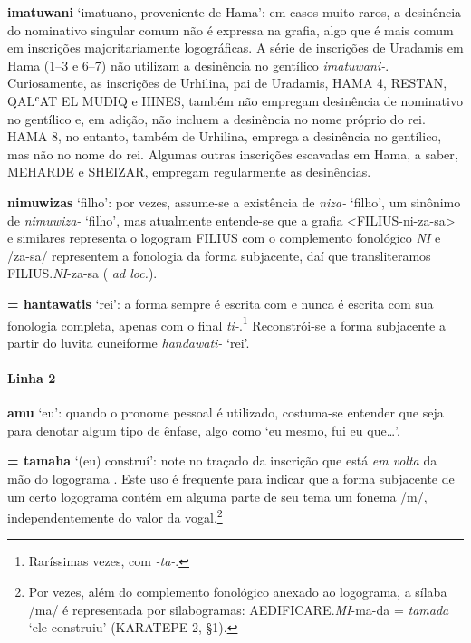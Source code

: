 \noindent\textbf{imatuwani} `imatuano, proveniente de Hama': em casos muito raros, a
desinência do nominativo singular comum não é expressa na grafia, algo que é
mais comum em inscrições majoritariamente logográficas. A série de inscrições de
Uradamis em Hama (1--3 e 6--7) não utilizam a desinência no gentílico
\emph{imatuwani-}.
Curiosamente, as inscrições de Urhilina, pai de Uradamis, HAMA 4,
RESTAN, QAL\textsc{ʿ}AT EL MUDIQ e HINES,
também não empregam desinência de nominativo no gentílico e, em adição, não
incluem a desinência no nome próprio do rei.
HAMA 8, no entanto, também de Urhilina, emprega a desinência no gentílico, mas
não no nome do rei.
Algumas outras inscrições escavadas em Hama, a saber, MEHARDE e SHEIZAR, empregam
regularmente as desinências.

\noindent\textbf{nimuwizas} `filho': por vezes, assume-se a existência de \emph{niza-}
`filho', um sinônimo de \emph{nimuwiza-} `filho', mas atualmente entende-se que
a grafia <FILIUS-ni-za-sa> e similares representa o logogram FILIUS com o
complemento fonológico \emph{NI} e /za-sa/ representem a fonologia da forma
subjacente, daí que transliteramos FILIUS.\emph{NI}-za-sa
( \emph{ad loc.}).

\noindent{} \textbf{= hantawatis} `rei': a forma sempre é escrita com  e
nunca é escrita com sua fonologia completa,
apenas com o final \emph{ti-}.\footnote{Raríssimas vezes, com \emph{-ta-}.}
Reconstrói-se a forma subjacente a partir do luvita cuneiforme
\emph{handawati-} `rei'.

\paragraph{Linha 2}
\textbf{amu} `eu': quando o pronome pessoal é utilizado, costuma-se entender que
seja para denotar algum tipo de ênfase, algo como `eu mesmo, fui eu que\ldots{}'.

\noindent{} \textbf{= tamaha} `(eu) construí': note no
traçado da inscrição que  está \emph{em volta} da mão do
logograma . Este uso é frequente para indicar que a
forma subjacente de um certo logograma contém em alguma parte de seu tema um
fonema /m/, independentemente do valor da vogal.\footnote{Por vezes, além
	do complemento fonológico anexado ao logograma, a sílaba /ma/ é representada
	por silabogramas: AEDIFICARE.\emph{MI}-ma-da = \emph{tamada} `ele construiu'
	(KARATEPE 2, §1).}

